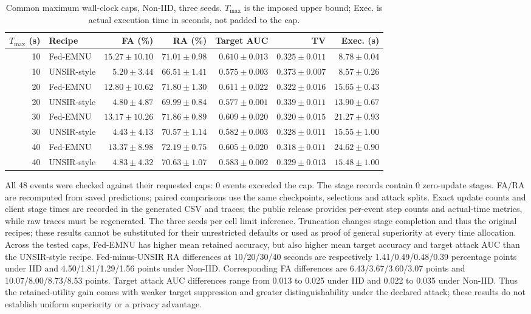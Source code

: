 \documentclass[software,article,submit,moreauthors]{Definitions/mdpi}
\begin{document}
\begin{table}[htbp]\centering\footnotesize\setlength{\tabcolsep}{4pt}
\caption{Common maximum wall-clock caps, Non-IID, three seeds. $T_{\max}$ is the imposed upper bound; Exec. is actual execution time in seconds, not padded to the cap.}\label{tab:walltime-noniid}
\begin{tabular}{rlrrrrr}\toprule $T_{\max}$ (s) & Recipe & FA (\%) & RA (\%) & Target AUC & TV & Exec. (s)\\\midrule
10 & Fed-EMNU & $15.27 \pm 10.10$ & $71.01 \pm 0.98$ & $0.610 \pm 0.013$ & $0.325 \pm 0.011$ & $8.78 \pm 0.04$\\
10 & UNSIR-style & $5.20 \pm 3.44$ & $66.51 \pm 1.41$ & $0.575 \pm 0.003$ & $0.373 \pm 0.007$ & $8.57 \pm 0.26$\\
20 & Fed-EMNU & $12.80 \pm 10.62$ & $71.80 \pm 1.30$ & $0.611 \pm 0.022$ & $0.322 \pm 0.016$ & $15.65 \pm 0.43$\\
20 & UNSIR-style & $4.80 \pm 4.87$ & $69.99 \pm 0.84$ & $0.577 \pm 0.001$ & $0.339 \pm 0.011$ & $13.90 \pm 0.67$\\
30 & Fed-EMNU & $13.17 \pm 10.26$ & $71.86 \pm 0.89$ & $0.609 \pm 0.020$ & $0.320 \pm 0.015$ & $21.27 \pm 0.93$\\
30 & UNSIR-style & $4.43 \pm 4.13$ & $70.57 \pm 1.14$ & $0.582 \pm 0.003$ & $0.328 \pm 0.011$ & $15.55 \pm 1.00$\\
40 & Fed-EMNU & $13.37 \pm 8.98$ & $72.19 \pm 0.75$ & $0.605 \pm 0.020$ & $0.318 \pm 0.011$ & $24.62 \pm 0.90$\\
40 & UNSIR-style & $4.83 \pm 4.32$ & $70.63 \pm 1.07$ & $0.583 \pm 0.002$ & $0.329 \pm 0.013$ & $15.48 \pm 1.00$\\
\bottomrule\end{tabular}\end{table}
All 48 events were checked against their requested caps: 0
events exceeded the cap. The stage records contain 0 zero-update stages.
FA/RA are recomputed from saved predictions; paired comparisons use the
same checkpoints, selections and attack splits. Exact update counts and client
stage times are recorded in the generated CSV and traces; the public release
provides per-event step counts and actual-time metrics, while raw traces must
be regenerated. The three seeds
per cell limit inference. Truncation changes stage completion and thus the
original recipes; these results cannot be substituted for their unrestricted
defaults or used as proof of general superiority at every time allocation.
Across the tested caps, Fed-EMNU has higher mean retained accuracy, but also
higher mean target accuracy and target attack AUC than the UNSIR-style recipe.
Fed-minus-UNSIR RA differences at 10/20/30/40 seconds are respectively
1.41/0.49/0.48/0.39 percentage points under IID and
4.50/1.81/1.29/1.56 points under Non-IID. Corresponding FA differences are
6.43/3.67/3.60/3.07 points and 10.07/8.00/8.73/8.53 points.
Target attack AUC differences range from 0.013 to 0.025 under IID and
0.022 to 0.035 under Non-IID. Thus the retained-utility gain comes with weaker
target suppression and greater distinguishability under the declared attack;
these results do not establish uniform superiority or a privacy advantage.
\end{document}
